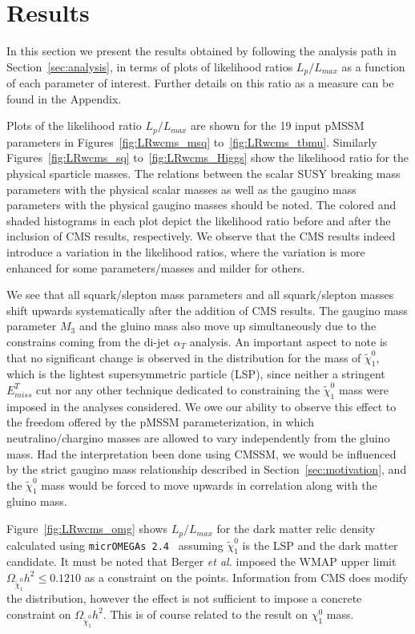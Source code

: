 \section{Results}
\label{sec:results}

In this section we present the results obtained by following the analysis path in Section~\ref{sec:analysis}, in terms of  plots of likelihood ratios $L_p / L_{max}$ as a function of each parameter of interest.  Further details on this ratio as a  measure can be found in the Appendix.  

Plots of the likelihood ratio $L_p/L_{max}$ are shown for the 19 input pMSSM parameters in Figures~\ref{fig:LRwcms_msq} to~\ref{fig:LRwcms_tbmu}.  Similarly Figures~\ref{fig:LRwcms_sq} to~\ref{fig:LRwcms_Higgs} show the likelihood ratio for the physical sparticle masses.  The relations between the scalar SUSY breaking mass parameters with the physical scalar masses as well as the gaugino mass parameters with the physical gaugino masses should be noted.  The colored and shaded histograms in each plot depict the likelihood ratio before and after the inclusion of CMS results, respectively.  We observe that the CMS results indeed introduce a variation in the likelihood ratios, where the variation is more enhanced for some parameters/masses and milder for others.  

We see that all squark/slepton mass parameters and all squark/slepton masses shift upwards systematically after the addition of CMS results.  The gaugino mass parameter $M_3$ and the gluino mass also move up simultaneously due to the constrains coming from the di-jet $\alpha_T$ analysis.  An important aspect to note is that no significant change is observed in the distribution for the mass of $\tilde{\chi}^0_1$, which is the lightest supersymmetric particle (LSP), since neither a stringent $E^T_{miss}$ cut nor any other technique dedicated to constraining the $\tilde{\chi}^0_1$ mass were imposed in the analyses considered.  We owe our ability to observe this effect to the freedom offered by the pMSSM parameterization, in which neutralino/chargino masses are allowed to vary independently from the gluino mass.  Had the interpretation been done using CMSSM, we would be influenced by the strict gaugino mass relationship described in Section~\ref{sec:motivation}, and the $\tilde{\chi}^0_1$ mass would be forced to move upwards in correlation along with the gluino mass.

Figure~\ref{fig:LRwcms_omg} shows $L_p/L_{max}$ for the dark matter relic density calculated using {\tt micrOMEGAs 2.4}~\cite{Belanger:2006is} assuming $\tilde{\chi}^0_1$ is the LSP and the dark matter candidate.  It must be noted that Berger {\it et al.} imposed the WMAP upper limit $\Omega_{\tilde{\chi}^0_1}h^2 \le 0.1210$ as a constraint on the points.  Information from CMS does modify the distribution, however the effect is not sufficient to impose a concrete constraint on $\Omega_{\tilde{\chi}^0_1}h^2$.  This is of course related to the result on $\chi^0_1$ mass.

